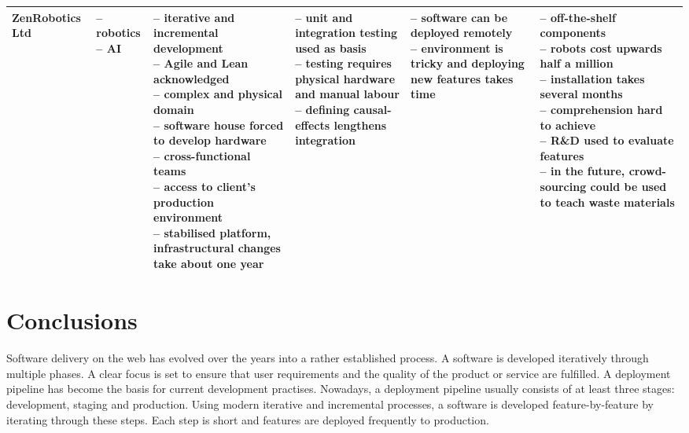 \documentclass[english]{tktltiki2}
\begin{document}
\begin{landscape}
\begin{longtable}{|p{2.5cm}|p{1.5cm}|p{4cm}|p{4cm}|p{4cm}|p{4cm}|}
        ZenRobotics Ltd &
        \parbox[t]{1.5cm}{– robotics \\
                          – AI} &
        \parbox[t]{4cm}{– iterative and incremental development \\
                        – Agile and Lean acknowledged \\
                        – complex and physical domain \\
                        – software house forced to develop hardware \\
                        – cross-functional teams \\
                        – access to client’s production environment \\
                        – stabilised platform, infrastructural changes take about one year} &
        \parbox[t]{4cm}{– unit and integration testing used as basis \\
                        – testing requires physical hardware and manual labour \\
                        – defining causal-effects lengthens integration} &
        \parbox[t]{4cm}{– software can be deployed remotely \\
                        – environment is tricky and deploying new features takes time} &
        \parbox[t]{4cm}{– off-the-shelf components \\
                        – robots cost upwards half a million \\
                        – installation takes several months \\
                        – comprehension hard to achieve \\
                        – R\&D used to evaluate features \\
                        – in the future, crowd-sourcing could be used to teach waste materials} \\

        \hline

    \end{longtable}

\end{landscape}
\restoregeometry


\section{Conclusions}

Software delivery on the web has evolved over the years into a rather established process. A software is developed iteratively through multiple phases. A clear focus is set to ensure that user requirements and the quality of the product or service are fulfilled. A deployment pipeline has become the basis for current development practises. Nowadays, a deployment pipeline usually consists of at least three stages: development, staging and production. Using modern iterative and incremental processes, a software is developed feature-by-feature by iterating through these steps. Each step is short and features are deployed frequently to production.
\end{document}
